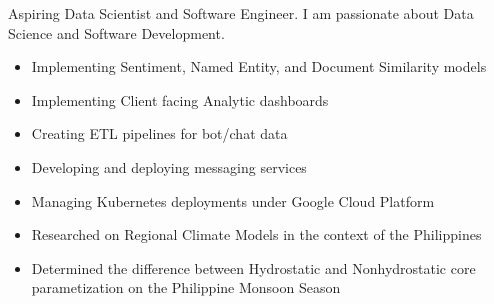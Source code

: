 \documentclass[10pt,a4paper]{altacv}
\begin{document}

\begin{fullwidth}
\makecvheader
\end{fullwidth}


Aspiring Data Scientist and Software Engineer. I am passionate about Data Science and Software Development.


\begin{itemize}
\item Implementing Sentiment, Named Entity, and Document Similarity models
\item Implementing Client facing Analytic dashboards
\item Creating ETL pipelines for bot/chat data
\item Developing and deploying messaging services
\item Managing Kubernetes deployments under Google Cloud Platform
\end{itemize}

\divider

\begin{itemize}
\item Researched on Regional Climate Models in the context of the Philippines
\item Determined the difference between Hydrostatic and Nonhydrostatic core parametization on the Philippine Monsoon Season
\end{itemize}
\end{document}
